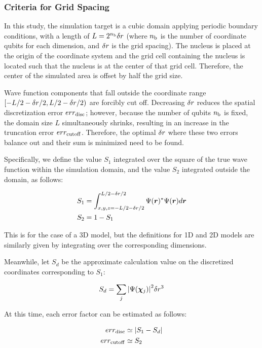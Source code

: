\documentclass[jctc-draft.tex]{subfiles}
\begin{document}
\subsubsection{Criteria for Grid Spacing}
\label{subsec:criteria-for-grid-spacing}

In this study, the simulation target is a cubic domain applying periodic
boundary conditions, with a length of $L=2^{n_{\mathrm{b}}}\delta r$ (where $n_{\mathrm{b}}$ is the
number of coordinate qubits for each dimension, and $\delta r$ is the grid
spacing). The nucleus is placed at the origin of the coordinate system and the
grid cell containing the nucleus is located such that the nucleus is at the
center of that grid cell. Therefore, the center of the simulated area is offset
by half the grid size.

Wave function components that fall outside the coordinate range
$[-L/2-\delta r/2, L/2-\delta r/2)$ are forcibly cut off. Decreasing $\delta r$
reduces the spatial discretization error $err_{\mathrm{disc}}$; however, because the number
of qubits $n_{\mathrm{b}}$ is fixed, the domain size $L$ simultaneously shrinks, resulting
in an increase in the truncation error $err_{\mathrm{cutoff}}$. Therefore, the optimal
$\delta r$ where these two errors balance out and their sum is minimized need to
be found.

Specifically, we define the value $S_1$ integrated over the square of the true
wave function within the simulation domain, and the value $S_2$ integrated
outside the domain, as follows:

\begin{align}
S_1 &= \int_{x,y,z=-L/2-\delta r/2}^{L/2-\delta r/2}\Psi(\bm{r})^{\ast}\Psi(\bm{r}) d\bm{r} \\
S_2 &= 1 - S_1
\end{align}

This is for the case of a 3D model, but the definitions for 1D and 2D models are
similarly given by integrating over the corresponding dimensions.

Meanwhile, let $S_d$ be the approximate calculation value on the discretized
coordinates corresponding to $S_1$:

\begin{equation}
S_d = \sum_{j}{\left| \Psi(\bm{\chi}_{j}) \right|}^2 \delta r^3
\end{equation}

At this time, each error factor can be estimated as follows:

\begin{align}
err_{\mathrm{disc}} &\simeq {\left| S_1 - S_d \right|} \label{eq:err-disc-definition}\\
err_{\mathrm{cutoff}} &\simeq S_2 \label{eq:err-cutoff-definition}
\end{align}
\end{document}
